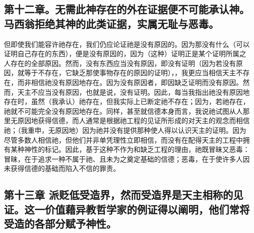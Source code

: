 
\subsection{第十二章。无需此神存在的外在证据便不可能承认神。马西翁拒绝其神的此类证据，实属无耻与恶毒。}

但即使我们能容许祂存在，我们仍应论证祂是没有原因的。因为那没有什么（可以证明自己存在的东西），便是没有原因的，因为（这种）证明正是某个证明所属之人存在的全部原因。然而，没有东西应当没有原因，即没有证明（因为若没有原因，就等于不存在，它缺乏那使事物存在的原因的证明），，我更应当相信天主不存在，而非相信祂没有原因地存在。因为没有原因者，即因缺乏证明而没有原因。然而，天主不应当没有原因，也就是说，没有证明。因此，每当我指出祂没有原因地存在时，虽然（我承认）祂存在，但我实际上已断定祂不存在；因为，若祂存在，祂就不可能完全没有原因地存在。同样，甚至就信德本身而言，我说祂试图从人那里无原因地获得信德，而人通常是根据祂工程的见证所形成的对天主的观念而相信祂；（我重申，无原因地）因为祂并没有提供那种使人得以认识天主的证明。因为尽管多数人相信祂，但他们并非单凭理性立即相信，而没有在配得天主的工程中拥有某种神性的标记。因此，基于这种不作为和缺乏工程的理由，祂既冒昧又恶毒：冒昧，在于追求一种不属于祂、且未为之奠定基础的信德；恶毒，在于使许多人因未获得信德的基础而陷入不信的罪责。\par


\subsection{第十三章 派贬低受造界，然而受造界是天主相称的见证。这一价值藉异教哲学家的例证得以阐明，他们常将受造的各部分赋予神性。}

